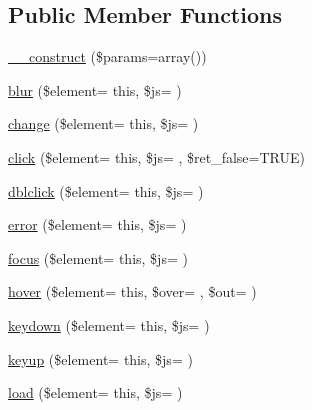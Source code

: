 \subsection*{Public Member Functions}
\begin{DoxyCompactItemize}
\item 
\hyperlink{class_c_i___javascript_a568ecdb0d73d2a870f33189739922a50}{\+\_\+\+\_\+construct} (\$params=array())
\item 
\hyperlink{class_c_i___javascript_a6125f6eca076179902d891ede8aaa79c}{blur} (\$element= \textquotesingle{}this\textquotesingle{}, \$js= \textquotesingle{}\textquotesingle{})
\item 
\hyperlink{class_c_i___javascript_aa091633b134b81e4caf9d0eee0bf3299}{change} (\$element= \textquotesingle{}this\textquotesingle{}, \$js= \textquotesingle{}\textquotesingle{})
\item 
\hyperlink{class_c_i___javascript_a6048b9a0f28be2dc60498a7284aba2af}{click} (\$element= \textquotesingle{}this\textquotesingle{}, \$js= \textquotesingle{}\textquotesingle{}, \$ret\+\_\+false=T\+R\+U\+E)
\item 
\hyperlink{class_c_i___javascript_a83698e9e3b9996852589c39b5eb136af}{dblclick} (\$element= \textquotesingle{}this\textquotesingle{}, \$js= \textquotesingle{}\textquotesingle{})
\item 
\hyperlink{class_c_i___javascript_a1c84a9a14d971e03d13f5c4e10e6c79a}{error} (\$element= \textquotesingle{}this\textquotesingle{}, \$js= \textquotesingle{}\textquotesingle{})
\item 
\hyperlink{class_c_i___javascript_a84f8cd6221f58c5ad22bf5408f259b81}{focus} (\$element= \textquotesingle{}this\textquotesingle{}, \$js= \textquotesingle{}\textquotesingle{})
\item 
\hyperlink{class_c_i___javascript_a8f4298c82e576b95f6e13d9c7ae2f3e0}{hover} (\$element= \textquotesingle{}this\textquotesingle{}, \$over= \textquotesingle{}\textquotesingle{}, \$out= \textquotesingle{}\textquotesingle{})
\item 
\hyperlink{class_c_i___javascript_ae1b580396f9e7b3eb3018946e37b64a3}{keydown} (\$element= \textquotesingle{}this\textquotesingle{}, \$js= \textquotesingle{}\textquotesingle{})
\item 
\hyperlink{class_c_i___javascript_a96655359803d164f26ead21db2980f32}{keyup} (\$element= \textquotesingle{}this\textquotesingle{}, \$js= \textquotesingle{}\textquotesingle{})
\item 
\hyperlink{class_c_i___javascript_a27f32c982522ffd8d4224131757903b8}{load} (\$element= \textquotesingle{}this\textquotesingle{}, \$js= \textquotesingle{}\textquotesingle{})

\end{DoxyCompactItemize}

